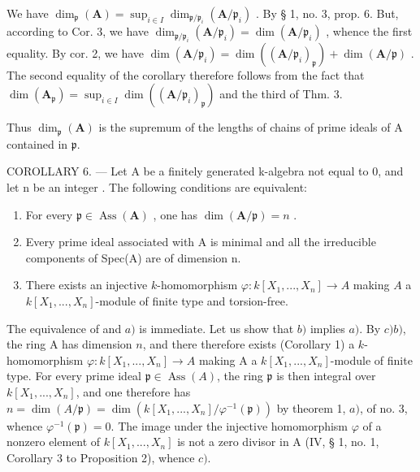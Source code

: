 We have \(\dim_{\mathfrak{p}}(\mathbf{A}) = \sup_{i\in I}\dim_{\mathfrak{p} / \mathfrak{p}_i}(\mathbf{A} / \mathfrak{p}_i)\) . By § 1, no. 3, prop. 6. But, according to Cor. 3, we have \(\dim_{\mathfrak{p} / \mathfrak{p}_i}(\mathbf{A} / \mathfrak{p}_i) = \dim (\mathbf{A} / \mathfrak{p}_i)\) , whence the first equality. By cor. 2, we have \(\dim (\mathbf{A} / \mathfrak{p}_i) = \dim ((\mathbf{A} / \mathfrak{p}_i)_{\mathfrak{p}}) + \dim (\mathbf{A} / \mathfrak{p})\) . The second equality of the corollary therefore follows from the fact that \(\dim (\mathbf{A}_{\mathfrak{p}}) = \sup_{i\in I}\dim ((\mathbf{A} / \mathfrak{p}_i)_{\mathfrak{p}})\) and the third of Thm. 3.

Thus \(\dim_{\mathfrak{p}}(\mathbf{A})\) is the supremum of the lengths of chains of prime ideals of A contained in \(\mathfrak{p}\).

COROLLARY 6. --- Let A be a finitely generated k-algebra not equal to 0, and let n be an integer . The following conditions are equivalent:

\begin{enumerate}
\def\labelenumi{\alph{enumi})}
\item
  For every \(\mathfrak{p} \in \operatorname{Ass}(\mathbf{A})\) , one has \(\dim(\mathbf{A}/\mathfrak{p}) = n\) .
\item
  Every prime ideal associated with A is minimal and all the irreducible components of Spec(A) are of dimension n.
\item
  There exists an injective \(k\)-homomorphism \(\varphi: k[X_1, ..., X_n] \to A\) making \(A\) a \(k[X_1, ..., X_n]\)-module of finite type and torsion-free.
\end{enumerate}

The equivalence of  and \(a)\) is immediate. Let us show that \(b)\) implies \(a)\). By \(c)\)\(b)\), the ring A has dimension \(n\), and there therefore exists (Corollary 1) a \(k\)-homomorphism \(\varphi : k[X_1, ..., X_n] \to A\) making A a \(k[X_1, ..., X_n]\)-module of finite type. For every prime ideal \(\mathfrak{p} \in \operatorname{Ass}(A)\), the ring \(\mathfrak{p}\) is then integral over \(k[X_1, ..., X_n]\), and one therefore has \(n = \dim(A/\mathfrak{p}) = \dim(k[X_1, ..., X_n]/\varphi^{-1}(\mathfrak{p}))\) by theorem 1, \(a)\), of no. 3, whence \(\varphi^{-1}(\mathfrak{p}) = 0\). The image under the injective homomorphism \(\varphi\) of a nonzero element of \(k[X_1, ..., X_n]\) is not a zero divisor in A (IV, § 1, no. 1, Corollary 3 to Proposition 2), whence \(c)\).

